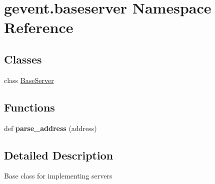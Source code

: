 \hypertarget{namespacegevent_1_1baseserver}{}\section{gevent.\+baseserver Namespace Reference}
\label{namespacegevent_1_1baseserver}
\subsection*{Classes}
\begin{DoxyCompactItemize}
\item 
class \hyperlink{classgevent_1_1baseserver_1_1_base_server}{Base\+Server}
\end{DoxyCompactItemize}
\subsection*{Functions}
\begin{DoxyCompactItemize}
\item 
\mbox{\label{namespacegevent_1_1baseserver_a0efe82b9b2362f2ad7bd41f0b222b1f1}} 
def {\bfseries parse\+\_\+address} (address)
\end{DoxyCompactItemize}


\subsection{Detailed Description}
\begin{DoxyVerb}Base class for implementing servers\end{DoxyVerb}
 